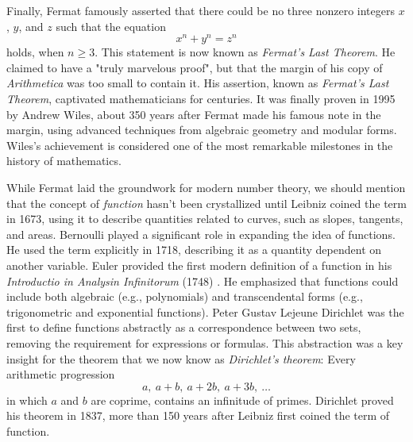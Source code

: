 \documentclass{article}
\theoremstyle{definition}
\theoremstyle{remark}
\begin{document}
Finally, Fermat famously asserted that there could be no three nonzero integers $x$, $y$, and $z$ such that the equation
\begin{equation*}
  x^n+y^n=z^n
\end{equation*}
holds, when $n\geq 3$. This statement is now known as \emph{Fermat's Last Theorem}. He claimed to have a "truly marvelous proof", but that the margin of his copy of \emph{Arithmetica} was too small to contain it. His assertion, known as \emph{Fermat’s Last Theorem}, captivated mathematicians for centuries. It was finally proven in 1995 by Andrew Wiles, about 350 years after Fermat made his famous note in the margin, using advanced techniques from algebraic geometry and modular forms. Wiles’s achievement is considered one of the most remarkable milestones in the history of mathematics.

While Fermat laid the groundwork for modern number theory, we should mention that the concept of \emph{function} hasn't been crystallized until Leibniz coined the term in 1673, using it to describe quantities related to curves, such as slopes, tangents, and areas. Bernoulli played a significant role in expanding the idea of functions. He used the term explicitly in 1718, describing it as a quantity dependent on another variable. Euler provided the first modern definition of a function in his \emph{Introductio in Analysin Infinitorum} (1748) \cite{euler1988}. He emphasized that functions could include both algebraic (e.g., polynomials) and transcendental forms (e.g., trigonometric and exponential functions). Peter Gustav Lejeune Dirichlet was the first to define functions abstractly as a correspondence between two sets, removing the requirement for expressions or formulas. This abstraction was a key insight for the theorem that we now know as \emph{Dirichlet's theorem}: Every arithmetic progression
\begin{equation*}
  a,\ a+b,\ a+2b,\ a+3b,\ \ldots
\end{equation*}
in which $a$ and $b$ are coprime, contains an infinitude of primes. Dirichlet proved his theorem in 1837, more than 150 years after Leibniz first coined the term of function.
\end{document}
